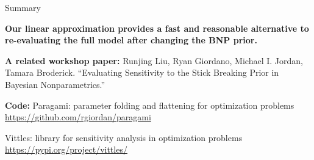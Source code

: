 \documentclass[10pt]{beamer}\usepackage[]{graphicx}\usepackage[]{color}
\begin{document}












\begin{frame}{Summary}

\vspace{1em}

\begin{mdframed}[style=MyFrame]
\begin{center}
{\bf Our linear approximation provides a fast and reasonable alternative to
re-evaluating the full model after changing the BNP prior.}
\end{center}
\end{mdframed}

\vspace{0.5em}

{\bf A related workshop paper: }\newline
Runjing Liu, Ryan Giordano, Michael I. Jordan, Tamara Broderick. \newline
“Evaluating Sensitivity to the Stick Breaking Prior in Bayesian Nonparametrics.”

\vspace{1em}

{\bf Code: }\newline
Paragami: parameter folding and flattening for optimization problems \newline
{\color{blue}\url{https://github.com/rgiordan/paragami}}

Vittles: library for sensitivity analysis in optimization problems \newline
{\color{blue}\url{https://pypi.org/project/vittles/}}


\end{frame}
\end{document}
